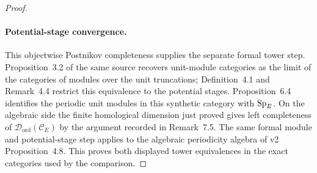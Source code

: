 \begin{proof}
\paragraph{Potential-stage convergence.}
This objectwise Postnikov completeness supplies the separate formal
tower step. Proposition~3.2 of the same source recovers unit-module
categories as the limit of the categories of modules over the unit
truncations; Definition~4.1 and Remark~4.4 restrict this equivalence
to the potential stages. Proposition~6.4 identifies the periodic
unit modules in this synthetic category with $\mathrm{Sp}_E$. On the
algebraic side the finite homological dimension just proved gives
left completeness of $\mathcal D_{\mathrm{ord}}(\mathscr C_E)$ by the
argument recorded in Remark~7.5. The same formal module and
potential-stage step applies to the algebraic periodicity algebra of
v2 Proposition~4.8. This proves both displayed tower equivalences in
the exact categories used by the comparison.
\end{proof}

